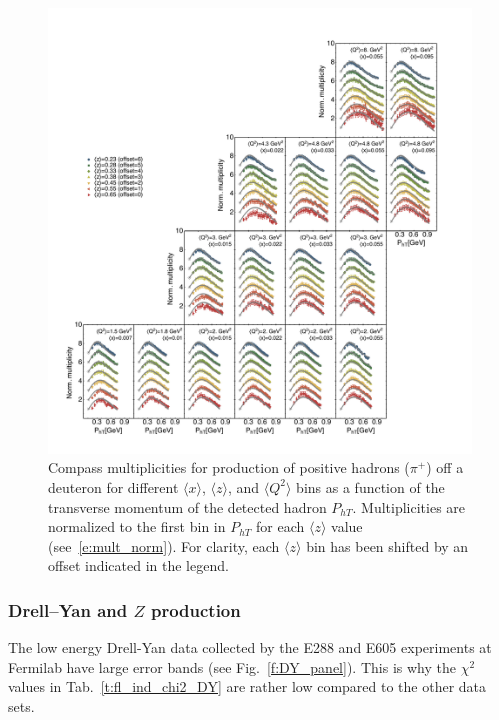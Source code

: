 \documentclass[aps,preprintnumbers,showpacs,nofootinbib,superscriptaddress,floatfix]{revtex4}
\begin{document}
\begin{figure}[h!]
\begin{center}
\includegraphics[width=\textwidth]{plots/COMPASS_SCIplot_flINDEP_Piplus.pdf}
\end{center}
\caption{Compass multiplicities for production of positive hadrons ($\pi^+$) off a deuteron for different $\langle x \rangle$, $\langle z \rangle$, and $\langle Q^2 \rangle$ bins as a function of the transverse momentum of the detected hadron $P_{hT}$. Multiplicities are normalized to the first bin in  $P_{hT}$ for each $\langle z \rangle$ value (see~\eqref{e:mult_norm}). For clarity, each $\langle z \rangle$  bin has been shifted by an offset indicated in the legend.} 
\label{f:C_pip}
\end{figure}





\subsubsection*{Drell--Yan and $Z$ production}
\label{sss:DYZ_agreement}


The low energy Drell-Yan data collected by the E288 and E605 experiments at Fermilab have large error bands (see Fig.~\ref{f:DY_panel}). This is why the $\chi^2$ values in Tab.~\ref{t:fl_ind_chi2_DY} are rather low compared to the other data sets. 
\end{document}
